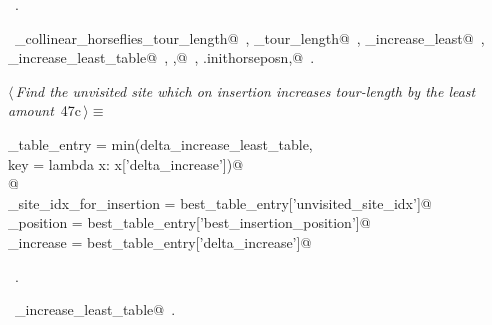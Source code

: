 \documentclass[11.5pt]{report}
\begin{document}
\begin{flushleft}
\begin{list}{}{}
\mbox{}\verb@                                   'delta_increase'          : delta_increase_least})@\\
\mbox{}\verb@@{\NWsep}
\end{list}
\vspace{-1.5ex}
\footnotesize
\begin{list}{}{\setlength{\itemsep}{-\parsep}\setlength{\itemindent}{-\leftmargin}}
\item \NWtxtMacroRefIn\ .
\item \NWtxtIdentsUsed\nobreak\  \verb@compute_collinear_horseflies_tour_length@\nobreak\ , \verb@current_tour_length@\nobreak\ , \verb@delta_increase_least@\nobreak\ , \verb@delta_increase_least_table@\nobreak\ , \verb@ibest,@\nobreak\ , \verb@self.inithorseposn,@\nobreak\ .
\item{}
\end{list}
\vspace{4ex}
\end{flushleft}


\vspace{-0.8cm}\newchunk 

\begin{flushleft} \small\label{scrap71}\raggedright\small
{} $\langle\,${\itshape Find the unvisited site which on insertion increases tour-length by the least amount}\nobreak\ {\footnotesize {47c}}$\,\rangle\equiv$
\vspace{-1ex}
\begin{list}{}{} \item
\mbox{}\verb@best_table_entry = min(delta_increase_least_table, \@\\
\mbox{}\verb@                         key = lambda x: x['delta_increase'])@\\
\mbox{}\verb@         @\\
\mbox{}\verb@unvisited_site_idx_for_insertion = best_table_entry['unvisited_site_idx']@\\
\mbox{}\verb@insertion_position               = best_table_entry['best_insertion_position']@\\
\mbox{}\verb@delta_increase                   = best_table_entry['delta_increase']@\\
\mbox{}\verb@@{\NWsep}
\end{list}
\vspace{-1.5ex}
\footnotesize
\begin{list}{}{\setlength{\itemsep}{-\parsep}\setlength{\itemindent}{-\leftmargin}}
\item \NWtxtMacroRefIn\ .
\item \NWtxtIdentsUsed\nobreak\  \verb@delta_increase_least_table@\nobreak\ .
\item{}
\end{list}
\vspace{4ex}
\end{flushleft}
\end{document}
